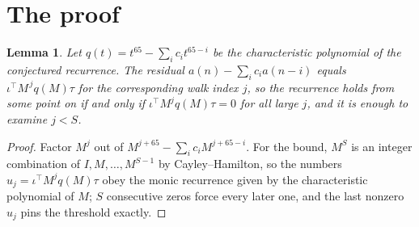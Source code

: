 \documentclass[11pt,a4paper]{article}
\theoremstyle{plain}
\newtheorem{lemma}[theorem]{Lemma}
\theoremstyle{definition}
\begin{document}
\section{The proof}

\begin{lemma}\label{lem:crit}
Let $q(t)=t^{65}-\sum_i c_it^{65-i}$ be the characteristic polynomial of the
conjectured recurrence. The residual $a(n)-\sum_ic_ia(n-i)$ equals
$\iota^{\!\top}M^{\,j}q(M)\tau$ for the corresponding walk index $j$, so the recurrence
holds from some point on if and only if $\iota^{\!\top}M^{j}q(M)\tau=0$ for all large $j$,
and it is enough to examine $j<S$.
\end{lemma}

\begin{proof}
Factor $M^{j}$ out of $M^{j+65}-\sum_ic_iM^{j+65-i}$. For the bound, $M^{S}$
is an integer combination of $I,M,\dots,M^{S-1}$ by Cayley--Hamilton, so the numbers
$u_j=\iota^{\!\top}M^{j}q(M)\tau$ obey the monic recurrence given by the characteristic
polynomial of $M$; $S$ consecutive zeros force every later one, and the last nonzero $u_j$
pins the threshold exactly.
\end{proof}
\end{document}
